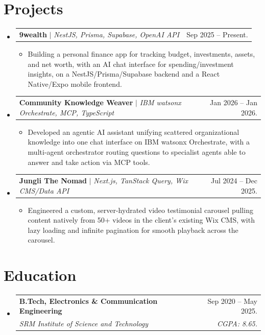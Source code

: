 \documentclass[letterpaper,11pt]{article}
\makeatletter
\newcommand{\resumeItem}[1]{
  \item\small{
    {#1 \vspace{-2pt}}
  }
}
\newcommand{\resumeSubheading}[4]{
  \vspace{-2pt}\item
    \begin{tabular*}{0.97\textwidth}[t]{l@{\extracolsep{\fill}}r}
      \textbf{#1} & #2 \\
      \textit{\small#3} & \textit{\small #4} \\
    \end{tabular*}\vspace{-7pt}
}
\newcommand{\resumeProjectHeading}[2]{
    \item
    \begin{tabular*}{0.97\textwidth}{l@{\extracolsep{\fill}}r}
      \small#1 & #2 \\
    \end{tabular*}\vspace{-7pt}
}
\newcommand{\resumeSubHeadingListStart}{\begin{itemize}[leftmargin=0.15in, label={}]}
\newcommand{\resumeSubHeadingListEnd}{\end{itemize}}
\newcommand{\resumeItemListStart}{\begin{itemize}}
\newcommand{\resumeItemListEnd}{\end{itemize}\vspace{-5pt}}
\makeatother
\begin{document}
\section{Projects}
    \resumeSubHeadingListStart
      \resumeProjectHeading
          {\textbf{9wealth} $|$ \emph{NestJS, Prisma, Supabase, OpenAI API}}{Sep 2025 -- Present.}
          \resumeItemListStart
            \resumeItem{Building a personal finance app for tracking budget, investments, assets, and net worth, with an AI chat interface for spending/investment insights, on a NestJS/Prisma/Supabase backend and a React Native/Expo mobile frontend.}
          \resumeItemListEnd
      \resumeProjectHeading
          {\textbf{Community Knowledge Weaver} $|$ \emph{IBM watsonx Orchestrate, MCP, TypeScript}}{Jan 2026 -- Jan 2026.}
          \resumeItemListStart
            \resumeItem{Developed an agentic AI assistant unifying scattered organizational knowledge into one chat interface on IBM watsonx Orchestrate, with a multi-agent orchestrator routing questions to specialist agents able to answer and take action via MCP tools.}
          \resumeItemListEnd
      \resumeProjectHeading
          {\textbf{Jungli The Nomad} $|$ \emph{Next.js, TanStack Query, Wix CMS/Data API}}{Jul 2024 -- Dec 2025.}
          \resumeItemListStart
            \resumeItem{Engineered a custom, server-hydrated video testimonial carousel pulling content natively from 50+ videos in the client's existing Wix CMS, with lazy loading and infinite pagination for smooth playback across the carousel.}
          \resumeItemListEnd
    \resumeSubHeadingListEnd


\section{Education}
  \resumeSubHeadingListStart
    \resumeSubheading
      {B.Tech, Electronics \& Communication Engineering}{Sep 2020 -- May 2025.}
      {SRM Institute of Science and Technology}{CGPA: 8.65.}
  \resumeSubHeadingListEnd


\end{document}
